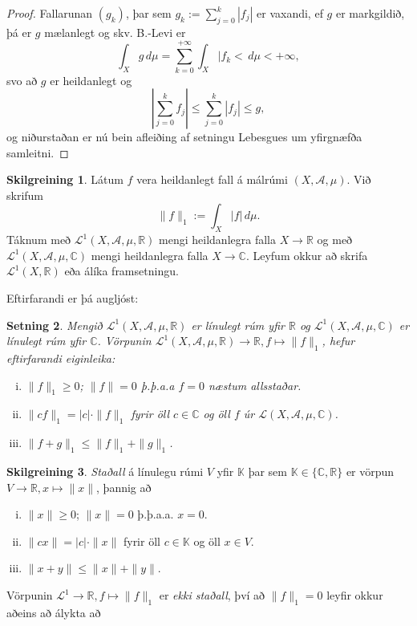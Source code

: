 \documentclass[a4paper,icelandic,11pt]{book}
\theoremstyle{plain}      \newtheorem{setn}{Setning}[chapter]
\theoremstyle{definition} \newtheorem{skilgr}[setn]{Skilgreining}
\theoremstyle{remark}     \newtheorem*{ath}{Athugasemd}
\newcommand{\R}{\mathbb R}
\newcommand{\C}{\mathbb C}
\begin{document}
\begin{proof}
  Fallarunan $(g_{k})$, þar sem $g_{k}:=\sum_{j=0}^{k}|f_{j}|$ er
  vaxandi, ef $g$ er markgildið, þá er $g$ mælanlegt og skv. B.-Levi
  er
  \[
  \int_{X}g\,d\mu
  = \sum_{k=0}^{+\infty}\int_{X}|f_{k}<\,d\mu
  < +\infty,
  \]
  svo að $g$ er heildanlegt og
  \[
  \left| \sum_{j=0}^{k}f_{j} \right|
  \le \sum_{j=0}^{k} |f_{j}|
  \le g,
  \]
  og niðurstaðan er nú bein afleiðing af setningu Lebesgues um
  yfirgnæfða samleitni. 
\end{proof}
\begin{skilgr}
  Látum $f$ vera heildanlegt fall á málrúmi $(X,\mathcal A,\mu)$. Við
  skrifum
  \[
  \|f\|_{1} := \int_{X}|f|\,d\mu.
  \]
  Táknum með $\mathcal L^{1}(X,\mathcal A,\mu,\R)$ mengi heildanlegra
  falla $X\to\R$ og með $\mathcal L^{1}(X,\mathcal A,\mu,\C)$ mengi
  heildanlegra falla $X\to\C$. Leyfum okkur að skrifa $\mathcal
  L^{1}(X,\R)$ eða álíka framsetningu.
\end{skilgr}
Eftirfarandi er þá augljóst:
\begin{setn}
  Mengið $\mathcal L^{1}(X,\mathcal A,\mu,\R)$ er línulegt rúm yfir
  $\R$ og $\mathcal L^{1}(X,\mathcal A,\mu,\C)$ er línulegt rúm yfir
  $\C$. Vörpunin $\mathcal L^{1}(X,\mathcal A,\mu,\R)\to\R,
  f\mapsto\|f\|_{1}$, hefur eftirfarandi eiginleika:
  \begin{enumerate}[(i)]
  \item $\|f\|_{1}\ge 0$; $\|f\|=0$ þ.þ.a.a $f=0$ næstum allsstaðar.
  \item $\|cf\|_{1}=|c|\cdot\|f\|_{1}$ fyrir öll $c\in\C$ og öll $f$
    úr $\mathcal L(X,\mathcal A,\mu,\C)$.
  \item $\|f+g\|_{1}\le\|f\|_{1}+\|g\|_{1}$.
  \end{enumerate}
\end{setn}
\begin{skilgr}
  \emph{Staðall} á línulegu rúmi $V$ yfir
  $\mathbb K$ þar sem $\mathbb K\in\{\C,\R\}$ er vörpun
  $V\to\R,x\mapsto\|x\|$, þannig að
  \begin{enumerate}[(i)]
  \item $\|x\| \ge 0$; $\|x\|=0$ þ.þ.a.a. $x=0$.
  \item $\|cx\|=|c|\cdot\|x\|$ fyrir öll $c\in\mathbb K$ og öll
    $x\in{V}$.
  \item $\|x+y\|\le\|x\|+\|y\|$.
  \end{enumerate}
\end{skilgr}
Vörpunin $\mathcal L^{1}\to\R, f\mapsto \|f\|_{1}$ er \emph{ekki
  staðall}, því að $\|f\|_{1}=0$ leyfir okkur aðeins að álykta að
\end{document}
